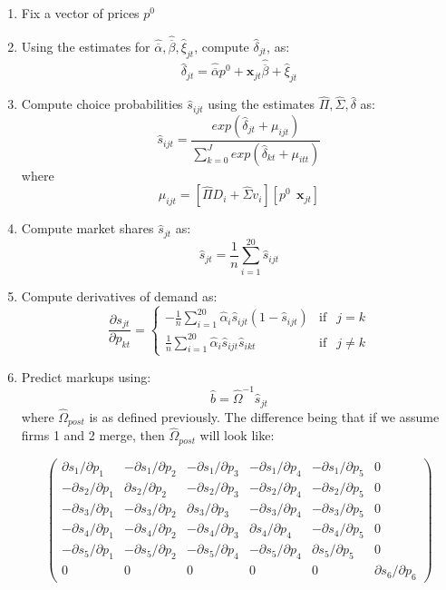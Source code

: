 \documentclass[12pt,english]{article}
\begin{document}
\begin{enumerate}
\begin{enumerate}
\item Fix a vector of prices $p^0$
\item Using the estimates for $\hat{\overline{\alpha}}, \hat{\overline{\beta}}, \hat{\xi}_{jt}$, compute $\hat{\delta}_{jt}$, as:
\[
\hat{\delta}_{jt}=\hat{\overline{\alpha}}p^{0}+\mathbf{x}_{jt} \hat{\overline{\beta}}+\hat{\xi}_{jt}
\]
\item Compute choice probabilities $\hat{s}_{ijt}$ using the estimates $\hat{\Pi}, \hat{\Sigma}, \hat{\delta}$ as:
\[
\hat{s}_{ijt}= \frac{exp(\hat{\delta}_{jt}+\mu_{ijt})}{\sum_{k=0}^{J}exp(\hat{\delta}_{kt}+\mu_{itt})}
\]
where 
\[
\mu_{ijt}=[\hat{\Pi}D_{i}+\hat{\Sigma}v_{i}][p^{0} \ \ \mathbf{x}_{jt}]
\]
\item Compute market shares $\hat{s}_{jt}$ as:
\[
\hat{s}_{jt}= \frac{1}{n}\sum_{i=1}^{20}\hat{s}_{ijt}
\]
\item Compute derivatives of demand as:
\[
\frac{\partial s_{jt}}{\partial p_{kt}}=\left\{\begin{array}{ccc}-\frac{1}{n}\sum_{i=1}^{20} \hat{\alpha}_{i}\hat{s}_{ijt}(1-\hat{s}_{ijt}) & \mbox{if} & j=k\\
\frac{1}{n}\sum_{i=1}^{20} \hat{\alpha}_{i}\hat{s}_{ijt}\hat{s}_{ikt} & \mbox{if} &j\neq k  \end{array}\right.
\]
\item Predict markups using:
\[
\hat{b}=\hat{\Omega}^{-1}\hat{s}_{jt}
\]
where $\hat{\Omega}_{post}$ is as defined previously. The difference being that if we assume firms 1 and 2 merge, then $\hat{\Omega}_{post}$ will look like:

\[
\left(\begin{array}{cccccc} 
\partial s_{1}/\partial p_{1} & -\partial s_{1}/\partial p_{2} &-\partial s_{1}/\partial p_{3} & -\partial s_{1}/\partial p_{4}& -\partial s_{1}/\partial p_{5}&0\\
-\partial s_{2}/\partial p_{1} & \partial s_{2}/\partial p_{2} &-\partial s_{2}/\partial p_{3} & -\partial s_{2}/\partial p_{4} &-\partial s_{2}/\partial p_{5} &0\\
-\partial s_{3}/\partial p_{1} & -\partial s_{3}/\partial p_{2} &\partial s_{3}/\partial p_{3} & -\partial s_{3}/\partial p_{4}&-\partial s_{3}/\partial p_{5}&0\\
-\partial s_{4}/\partial p_{1} &-\partial s_{4}/\partial p_{2} &-\partial s_{4}/\partial p_{3} &\partial s_{4}/\partial p_{4}&-\partial s_{4}/\partial p_{5} & 0\\
-\partial s_{5}/\partial p_{1}&-\partial s_{5}/\partial p_{2}&-\partial s_{5}/\partial p_{4}&-\partial s_{5}/\partial p_{4}&\partial s_{5}/\partial p_{5} & 0\\
0&0&0&0&0&\partial s_{6}/\partial p_{6}
\end{array}\right)
\]


\end{enumerate}
\end{enumerate}
\end{document}
